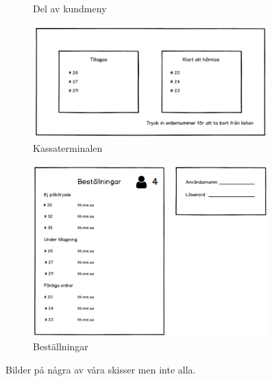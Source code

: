 \documentclass{article}
\theoremstyle{remark}                                         %
\begin{document}
\begin{figure}
\begin{subfigure}[b]{0.3\textwidth}
        \caption{Del av kundmeny}
    \end{subfigure}
        \begin{subfigure}[b]{0.3\textwidth}
        \includegraphics[width=\textwidth]{img/Skissbilder/Screen10.PNG}
        \caption{Kassaterminalen}
    \end{subfigure}
        \begin{subfigure}[b]{0.7\textwidth}
        \includegraphics[width=\textwidth]{img/Skissbilder/Screen11.PNG}
        \caption{Beställningar}
    \end{subfigure}
    
    
    \caption{Bilder på några av våra skisser men inte alla.}\label{fig:skisser}



\end{figure}
\end{document}
